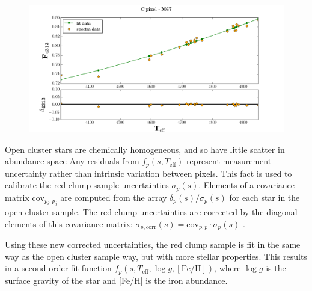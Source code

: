 \documentclass[preprint]{aastex}
\begin{document}
\begin{figure}[H]
\centering
\includegraphics[width = \linewidth]{M67_C_residual_4313.png}
\caption{}
\label{fig:spectra}
\end{figure}


Open cluster stars are chemically homogeneous, and so have little scatter in abundance space \citep{openclusters} Any residuals from $f_p(s,T_{\mathrm{eff}})$ represent measurement uncertainty rather than intrinsic variation between pixels. This fact is used to calibrate the red clump sample uncertainties $\sigma_p(s)$. Elements of a covariance matrix $\mathrm{cov}_{p_i,p_j}$ are computed from the array $\delta_p(s)/\sigma_p(s)$ for each star in the open cluster sample. The red clump uncertainties are corrected by the diagonal elements of this covariance matrix: $\sigma_{p,\mathrm{corr}}(s) = \mathrm{cov}_{p,p}\cdot\sigma_{p}(s)$ .  

Using these new corrected uncertainties, the red clump sample is fit in the same way as the open cluster sample way, but with more stellar properties. This results in a second order fit function $f_p(s,T_{\mathrm{eff}},\log g, [\mathrm{Fe/H}])$, where $\log g$ is the surface gravity of the star and [Fe/H] is the iron abundance.




\end{document}
